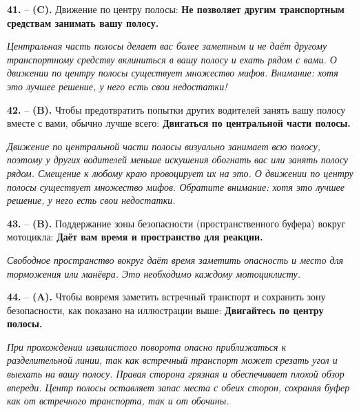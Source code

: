 \begin{minipage}{\linewidth}
\noindent\textbf{41.}  -- \textbf {(C).} Движение по центру полосы:  \textbf {Не позволяет другим транспортным средствам занимать вашу полосу.} \par \textit {Центральная часть полосы делает вас более заметным и не даёт другому транспортному средству вклиниться в вашу полосу и ехать рядом с вами. О движении по центру полосы существует множество мифов. Внимание: хотя это лучшее решение, у него есть свои недостатки!} \\
\end{minipage}

\begin{minipage}{\linewidth}
\noindent\textbf{42.}  -- \textbf {(B).} Чтобы предотвратить попытки других водителей занять вашу полосу вместе с вами, обычно лучше всего:  \textbf {Двигаться по центральной части полосы.} \par \textit {Движение по центральной части полосы визуально занимает всю полосу, поэтому у других водителей меньше искушения обогнать вас или занять полосу рядом. Смещение к любому краю провоцирует их на это. О движении по центру полосы существует множество мифов. Обратите внимание: хотя это лучшее решение, у него есть свои недостатки.} \\
\end{minipage}

\begin{minipage}{\linewidth}
\noindent\textbf{43.}  -- \textbf {(B).} Поддержание зоны безопасности (пространственного буфера) вокруг мотоцикла:  \textbf {Даёт вам время и пространство для реакции.} \par \textit {Свободное пространство вокруг даёт время заметить опасность и место для торможения или манёвра. Это необходимо каждому мотоциклисту.} \\
\end{minipage}

\begin{minipage}{\linewidth}
\noindent\textbf{44.}  -- \textbf {(A).} Чтобы вовремя заметить встречный транспорт и сохранить зону безопасности, как показано на иллюстрации выше:  \textbf {Двигайтесь по центру полосы.} \par \textit {При прохождении извилистого поворота опасно приближаться к разделительной линии, так как встречный транспорт может срезать угол и выехать на вашу полосу. Правая сторона грязная и обеспечивает плохой обзор впереди. Центр полосы оставляет запас места с обеих сторон, сохраняя буфер как от встречного транспорта, так и от обочины.} \\
\end{minipage}

